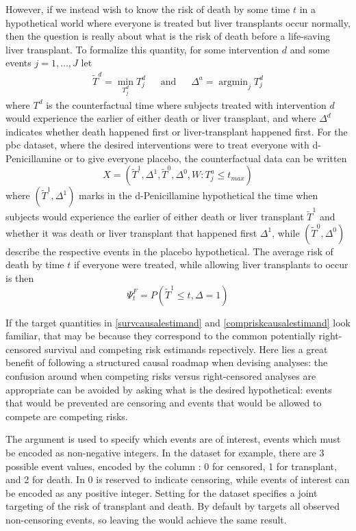 \documentclass{report}
\DeclareMathOperator*{\argmin}{argmin}
\newcommand{\1}{\ensuremath{\mathbf{1}}}
\newcommand{\T}{\ensuremath{\widetilde{T}}}
\renewcommand{\L}{\ensuremath{W}}
\begin{document}
However, if we instead wish to know the risk of death by some time \(t\) in a hypothetical world where everyone is treated but liver transplants occur normally, then the question is really about what is the risk of death before a life-saving liver transplant. To formalize this quantity, for some intervention \(d\) and some events \(j = 1,\dots, J\) let
\begin{align*}
\T^d = \min_{T^d_j} T^d_j \;\;\quad \text{and} \quad \;\; \Delta^a = \argmin_{j} T^d_j
\end{align*}
where \(T^d\) is the counterfactual time where subjects treated with intervention \(d\) would experience the earlier of either death or liver transplant, and where \(\Delta^d\) indicates whether death happened first or liver-transplant happened first.
For the pbc dataset, where the desired interventions were to treat everyone with d-Penicillamine or to give everyone placebo, the counterfactual data can be written
\[ X = (\T^1, \Delta^1, \T^0, \Delta^0, \L : T^a_j \leq t_{max}) \]
where \((\T^1, \Delta^1)\) marks in the d-Penicillamine hypothetical the time when subjects would experience the earlier of either death or liver transplant \(\T^1\) and whether it was death or liver transplant that happened first \(\Delta^1\), while \((\T^0, \Delta^0)\) describe the respective events in the placebo hypothetical. The average risk of death by time \(t\) if everyone were treated, while allowing liver transplants to occur is then
\begin{equation*}
 \Psi^F_t = P(\T^1 \leq t, \Delta = 1) \label{compriskcausalestimand2}
\end{equation*}

If the target quantities in \eqref{survcausalestimand} and \eqref{compriskcausalestimand} look familiar, that may be because they correspond to the common potentially right-censored survival and competing risk estimands repectively. Here lies a great benefit of following a structured causal roadmap when devising analyses: the confusion around when competing risks versus right-censored analyses are appropriate can be avoided by asking what is the desired hypothetical: events that would be prevented are censoring and events that would be allowed to compete are competing risks.

The  argument is used to specify which events are of interest, events which must be encoded as non-negative integers. In the  dataset for example, there are 3 possible event values, encoded by the   column : 0 for censored, 1 for transplant, and 2 for death. In  0 is reserved to indicate censoring, while events of interest can be encoded as any positive integer. Setting  for the  dataset specifies a joint targeting of the risk of transplant and death. By default  by targets all observed non-censoring events, so leaving the  would achieve the same result.
\end{document}
